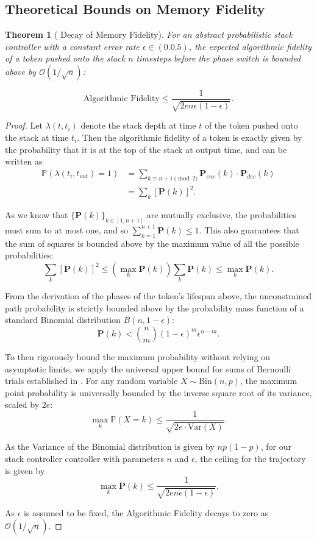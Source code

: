 \documentclass[10pt]{article} %
\newtheorem{theorem}{Theorem}
\begin{document}
\subsection{Theoretical Bounds on Memory Fidelity}
\begin{theorem}[ Decay of Memory Fidelity] For an abstract probabilistic stack controller with a constant error rate $\epsilon \in (0.0.5)$, the expected algorithmic fidelity of a token pushed onto the stack $n$ timesteps before the phase switch is bounded above by  $\mathcal{O}(1/\sqrt{n})$:

$$
\text{Algorithmic Fidelity} \leq \frac{1}{\sqrt{2e n \epsilon(1-\epsilon)}}.
$$

\end{theorem}
\begin{proof}

Let $\lambda(t,t_i)$ denote the stack depth at time $t$ of the token pushed onto the stack at time $t_i$. Then the algorithmic fidelity of a token is exactly given by the probability that it is at the top of the stack at output time, and can be written as
\begin{align*}
\mathbb{P}(\lambda(t_i,t_{out}) = 1) &= \sum_{k \equiv n+1 \pmod 2} \mathbf{P}_{enc}(k) \cdot \mathbf{P}_{dec}(k) \\
&= \sum_k [\mathbf{P}(k)]^2.
\end{align*}

As we know that $\{\mathbf{P}(k)\}_{k \in [1,n+1]}$ are mutually exclusive, the probabilities must sum to at most one, and so $\sum_{k=1}^{n+1} \mathbf{P}(k) \leq 1$. This also guarantees that the sum of squares is bounded above by the maximum value of all the possible probabilities:
$$
\sum_{k} [\mathbf{P}(k)]^2 \leq \left( \max_k \mathbf{P}(k) \right) \sum_k \mathbf{P}(k) \leq \max_k \mathbf{P}(k).
$$

From the derivation of the phases of the token’s lifespan above, the unconstrained path probability is strictly bounded above by the probability mass function of a standard Binomial distribution $B(n, 1-\epsilon)$:
$$
\mathbf{P}(k) < \binom{n}{m} (1-\epsilon)^m \epsilon^{n-m}.
$$

To then rigorously bound the maximum probability without relying on asymptotic limits, we apply the universal upper bound for sums of Bernoulli trials established in \cite{BAILLON_COMINETTI_VAISMAN_2016}. For any random variable $X \sim \text{Bin}(n,p)$, the maximum point probability is universally bounded by the inverse square root of its variance, scaled by $2e$:
$$
\max_k \mathbb{P}(X=k) \leq \frac{1}{\sqrt{2e \cdot \text{Var}(X)}}.
$$

As the Variance of the Binomial distribution is given by $np(1-p)$, for our stack controller controller with parameters $n$ and $\epsilon$, the ceiling for the trajectory is given by
$$
\max_k \mathbf{P}(k) \leq \frac{1}{\sqrt{2en\epsilon(1-\epsilon)}}.
$$

As $\epsilon$ is assumed to be fixed, the Algorithmic Fidelity decays to zero as $\mathcal{O}(1/\sqrt{n})$.

\end{proof}
\end{document}
